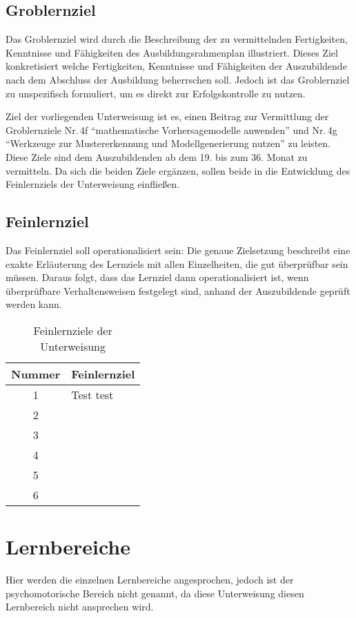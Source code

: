 \subsection{Groblernziel}
Das Groblernziel wird durch die Beschreibung der zu vermittelnden Fertigkeiten, Kenntnisse und Fähigkeiten des Ausbildungsrahmenplan illustriert. Dieses Ziel konkretisiert welche Fertigkeiten, Kenntnisse und Fähigkeiten der Auszubildende nach dem Abschluss der Ausbildung beherrschen soll. Jedoch ist das Groblernziel zu unspezifisch formuliert, um es direkt zur Erfolgskontrolle zu nutzen. 
\par
Ziel der vorliegenden Unterweisung ist es, einen Beitrag zur Vermittlung der Groblernziele Nr.\,4f \enquote{mathematische Vorhersagemodelle anwenden} und Nr.\,4g \enquote{Werkzeuge zur Mustererkennung und Modellgenerierung nutzen} zu leisten. Diese Ziele sind dem Auszubildenden ab dem 19. bis zum 36. Monat zu vermitteln. Da sich die beiden Ziele ergänzen, sollen beide in die Entwicklung des Feinlernziels der Unterweisung einfließen. 
 
\subsection{Feinlernziel}
Das Feinlernziel soll operationalisiert sein: Die genaue Zielsetzung beschreibt eine exakte Erläuterung des Lernziels mit allen Einzelheiten, die gut überprüfbar sein müssen. Daraus folgt, dass das Lernziel dann operationalisiert ist, wenn überprüfbare Verhaltensweisen festgelegt sind, anhand der Auszubildende geprüft werden kann. 
\par
\begin{table}[h!]
	\centering
	
	\begin{tabular}{@{}cl@{}}
		\toprule
		Nummer & Feinlernziel \\ \midrule
		1 & Test test\\
		2 &             \\ 
		3 & \\
		4 & \\
		5 & \\
		6 & \\
		
		\bottomrule
	\end{tabular}

	\caption{Feinlernziele der Unterweisung}
	\label{tab:lernziele}
\end{table}

\section{Lernbereiche}
Hier werden die einzelnen Lernbereiche angesprochen, jedoch ist der psychomotorische Bereich nicht genannt, da diese Unterweisung diesen Lernbereich nicht ansprechen wird.

